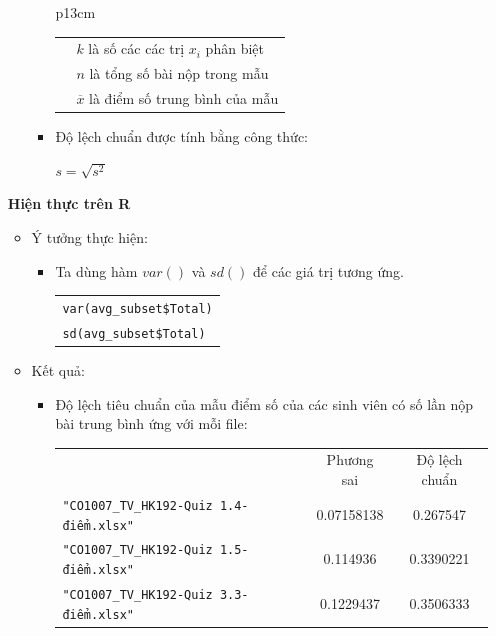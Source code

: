 \documentclass[a4paper]{article}
\theoremstyle{definition}
\begin{document}
\begin{enumerate}[a)]
\begin{itemize}
\begin{itemize}
\begin{center}
\begin{tabular}{p{13cm}}
\begin{tabular}{l l}
                        & $k$ là số các các trị $x_i$ phân biệt\\
                        & $n$ là tổng số bài nộp trong mẫu\\
                        & $\overline{x}$ là điểm số trung bình của mẫu
                    \end{tabular}
                \end{tabular}
            \end{center}
            \item Độ lệch chuẩn được tính bằng công thức:
            \begin{center}
                $s = \sqrt{s^2}$
            \end{center}
        \end{itemize}
    \end{itemize}
    \bf Hiện thực trên R\normalfont
    \begin{itemize}
        \item Ý tưởng thực hiện:
        \begin{itemize}
            \item Ta dùng hàm $var()$ và $sd()$ để các giá trị tương ứng.
            \begin{center}
                \begin{tabular}{p{13cm}}
                    \texttt{var(avg\_subset\$Total)}\\
                    \texttt{sd(avg\_subset\$Total)}
                \end{tabular}
            \end{center}
        \end{itemize}
        \item Kết quả:
        \begin{itemize}
            \item Độ lệch tiêu chuẩn của mẫu điểm số của các sinh viên có số lần nộp bài trung bình ứng với mỗi file:
            \begin{center}
                \begin{tabular}{l c c}
                     & Phương sai & Độ lệch chuẩn\\
                     \texttt{"CO1007\_TV\_HK192-Quiz 1.4-điểm.xlsx"} & 0.07158138 & 0.267547 \\ 
                     \texttt{"CO1007\_TV\_HK192-Quiz 1.5-điểm.xlsx"} & 0.114936 & 0.3390221\\ 
                     \texttt{"CO1007\_TV\_HK192-Quiz 3.3-điểm.xlsx"} & 0.1229437 & 0.3506333\\ 

\end{tabular}
\end{center}
\end{itemize}
\end{itemize}
\end{enumerate}
\end{document}
